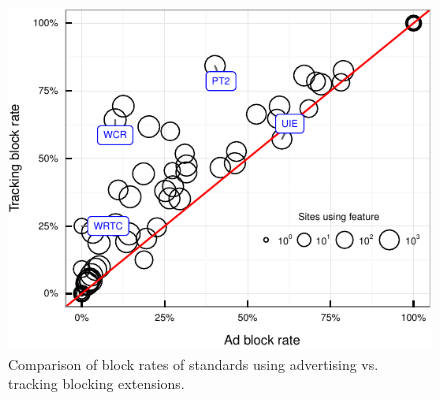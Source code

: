 \begin{figure}[ht]
  \centering
  \includegraphics[width=.5\textwidth]{figures/ad_vs_tracking_blocking.pdf}
  \caption{Comparison of block rates of standards using advertising vs. tracking blocking extensions.}
  \label{fig:feature-blocking-source}
\end{figure}
